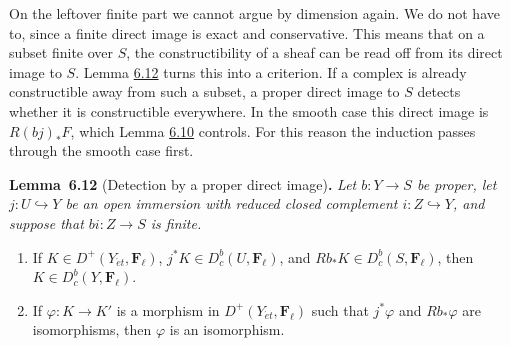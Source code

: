 \documentclass[11pt]{article}
\newenvironment{bpstatement}[2]{\par\addvspace{0.6\baselineskip}\noindent\textbf{#1}#2\textbf{.}\enspace\ignorespaces}
  {\par\addvspace{0.4\baselineskip}}
\newenvironment{bpstatementit}[2]{\begin{bpstatement}{#1}{#2}\itshape\ignorespaces}{\end{bpstatement}}
\providecommand{\Dbc}{}\renewcommand{\Dbc}{D^b_c}
\providecommand{\Fell}{}\renewcommand{\Fell}{\mathbf F_\ell}
\begin{document}
On the leftover finite part we cannot argue by dimension again. We do not have to, since a finite direct image is exact and conservative. This means that on a subset finite over \(S\), the constructibility of a sheaf can be read off from its direct image to \(S\). Lemma \hyperref[bp550]{6.12} turns this into a criterion. If a complex is already constructible away from such a subset, a proper direct image to \(S\) detects whether it is constructible everywhere. In the smooth case this direct image is \(R(bj)_*F\), which Lemma \hyperref[bp545]{6.10} controls. For this reason the induction passes through the smooth case first.

\label{bp550}%
\begin{bpstatementit}{Lemma~6.12}{ (Detection by a proper direct image)}
Let \(b:Y\to S\) be proper, let \(j:U\hookrightarrow Y\) be an open immersion with reduced closed complement \(i:Z\hookrightarrow Y\), and suppose that \(bi:Z\to S\) is finite.

\begin{enumerate}
\item If \(K\in D^+(Y_{\acute{e}t},\Fell)\), \(j^*K\in\Dbc(U,\Fell)\), and \(Rb_*K\in\Dbc(S,\Fell)\), then \(K\in\Dbc(Y,\Fell)\).
\item If \(\varphi:K\to K'\) is a morphism in \(D^+(Y_{\acute{e}t},\Fell)\) such that \(j^*\varphi\) and \(Rb_*\varphi\) are isomorphisms, then \(\varphi\) is an isomorphism.
\end{enumerate}
\end{bpstatementit}
\end{document}
